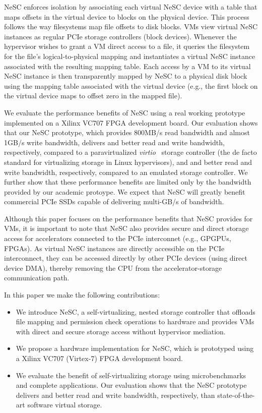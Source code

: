 NeSC enforces isolation by associating each virtual NeSC device with a table that maps offsets in the virtual device to blocks on the physical device. This process follows the way filesystems map file offsets to disk blocks.
%
VMs view virtual NeSC instances as regular PCIe storage controllers (block devices). Whenever the hypervisor wishes to grant a VM direct access to a file, it queries the filesystem for the file's logical-to-physical mapping and instantiates a virtual NeSC instance associated with the resulting mapping table.
%
Each access by a VM to its virtual NeSC instance is then transparently mapped by NeSC to a physical disk block using the mapping table associated with the virtual device (e.g., the first block on the virtual device maps to offset zero in the mapped file).

We evaluate the performance benefits of NeSC using a real working prototype implemented on a Xilinx VC707 FPGA development board. Our evaluation shows that our NeSC prototype, which provides 800MB/s read bandwidth and almost 1GB/s write bandwidth, delivers  and  better read and write bandwidth, respectively, compared to a paravirtualized \emph{virtio}~\cite{russell2008virtio} storage controller (the de facto standard for virtualizing storage in Linux hypervisors), and  and  better read and write bandwidth, respectively, compared to an emulated storage controller.
We further show that these performance benefits are limited only by the bandwidth provided by our academic protoype. We expect that NeSC will greatly benefit commercial PCIe SSDs capable of delivering multi-GB/s of bandwidth.



Although this paper focuses on the performance benefits that NeSC provides for VMs, it is important to note that NeSC also provides secure and direct storage access for accelerators connected to the PCIe interconnet (e.g., GPGPUs, FPGAs). As virtual NeSC instances are directly accessible on the PCIe interconnect, they can be accessed directly by other PCIe devices (using direct device DMA), thereby removing the CPU from the accelerator-storage communication path.

In this paper we make the following contributions:
\begin{itemize}
\item
 We introduce NeSC, a self-virtualizing, nested storage controller that offloads file mapping and permission check operations to hardware and provides VMs with direct and secure storage access without hypervisor mediation.

\item
  We propose a hardware implementation for NeSC, which is prototyped using a Xilinx VC707 (Virtex-7) FPGA development board.

\item
  We evaluate the benefit of self-virtualizing storage using microbenchmarks and complete applications. Our evaluation shows that the NeSC prototype delivers  and  better read and write bandwidth, respectively, than state-of-the-art software virtual storage.
  
\end{itemize}


